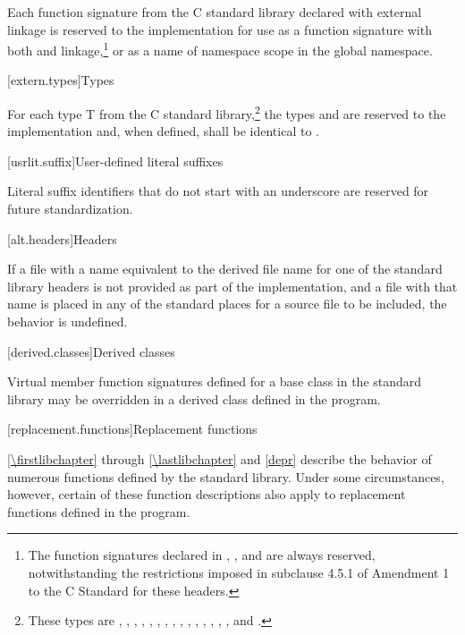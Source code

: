 \pnum
Each function signature from the C standard library declared with
%
external linkage
is reserved to the implementation for use as
a function signature with both
%
and
%
linkage,\footnote{The function signatures declared in
%
%
%
%
,
,
and
are always reserved, notwithstanding the restrictions imposed in subclause
4.5.1 of Amendment 1 to the C Standard for these headers.}
or as a name of namespace scope in the global namespace.

[extern.types]{Types}

\pnum
For each type T from the C standard library,\footnote{These types are
,
,
,
,
,
,
,
,
,
,
,
,
,
,
,
and
.}
the types
and
are reserved to the implementation and, when defined,
shall be identical to
.

[usrlit.suffix]{User-defined literal suffixes}

\pnum
Literal suffix identifiers that do not start with an underscore are reserved for future standardization.

[alt.headers]{Headers}

\pnum
If a file with a name
equivalent to the derived file name for one of the \Cpp{} standard library headers
is not provided as part of the implementation, and a file with that name
is placed in any of the standard places for a source file to be included,
the behavior is undefined.%
%

[derived.classes]{Derived classes}

\pnum
Virtual member function signatures defined
%
for a base class in the \Cpp{} standard
%
%
library may be overridden in a derived class defined in the program.

[replacement.functions]{Replacement functions}

\pnum
{}%
\ref{\firstlibchapter} through \ref{\lastlibchapter} and \ref{depr}
describe the behavior of numerous functions defined by
the \Cpp{} standard library.
Under some circumstances,
%
however, certain of these function descriptions also apply to replacement functions defined
in the program.

